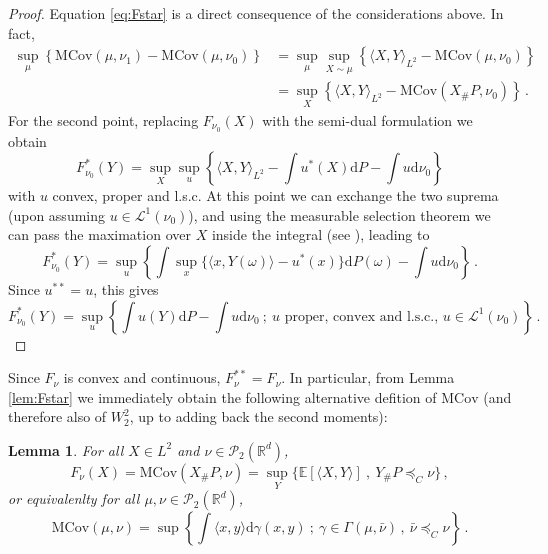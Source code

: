 \documentclass[12pt]{amsart}
\numberwithin{equation}{section}
\let\mc=\mathcal
\let\mr=\mathrm
\def\ed{\mathrm{d}}
\theoremstyle{plain}
\newtheorem{lemma}[theorem]{Lemma}
\theoremstyle{definition}
\newcommand\gab{\textcolor{blue}}
\begin{document}
\begin{proof} Equation \eqref{eq:Fstar} is a direct consequence of the considerations above. In fact,
\[
\begin{aligned}
\sup_\mu \left\{\mr{MCov}(\mu,\nu_1) -\mr{MCov}(\mu,\nu_0) \right\} &= \sup_\mu  \sup_{X \sim \mu} \left\{\langle X,Y\rangle_{L^2}  -\mr{MCov}(\mu,\nu_0) \right\} \\
&= \sup_X \left\{ \langle X,Y\rangle_{L^2}  -\mr{MCov}(X_\# P,\nu_0) \right\}\,.
\end{aligned}
\]
For the second point, replacing $F_{\nu_0}(X)$ with the semi-dual formulation we obtain
\begin{equation}\label{eq:supsupF}
F^*_{\nu_0}(Y) = \sup_X \sup_u \left\{ \langle X,Y\rangle_{L^2} - \int u^*(X) \ed P - \int u \ed \nu_0 \right\}
\end{equation}
with $u$ convex, proper and l.s.c. At this point we can exchange the two suprema (upon assuming $ u \in \mc{L}^1(\nu_0)$), and using the measurable selection theorem \cite[Theorem 6.9.13]{bogachev2007measure}
we can pass the maximation over $X$ inside the integral (see \cite[Lemma B.2]{aubin2026debiasing}), leading to
\[
F^*_{\nu_0}(Y) =  \sup_u \left\{ \int \sup_x\{ \langle x,Y(\omega)\rangle - u^*(x)\}  \ed P(\omega)- \int u \ed \nu_0 \right\}\,.
\]
Since $u^{**} = u$, this gives
\[
F^*_{\nu_0}(Y) = \sup_u \left\{ \int u(Y) \ed P - \int u \ed \nu_0 ~;~ u \text{ proper, convex and l.s.c., } u \in \mc{L}^1(\nu_0)\right\}\,.
\]
\end{proof}



Since $F_\nu$ is convex and continuous, $F^{**}_\nu = F_\nu$. In particular, from Lemma \ref{lem:Fstar} we immediately obtain the following alternative defition of $\mr{MCov}$ (and therefore also of $W_2^2$, up to adding back the second moments):

\begin{lemma}\label{lem:mcov} For all $X\in L^2$ and $\nu \in \mc{P}_2(\mathbb{R}^d)$,
\[
F_\nu(X)=\mr{MCov}(X_\#P,\nu) = \sup_Y\{\mathbb{E}[\langle X,Y\rangle]~,~Y_\#P \preceq_C \nu\}\,,
\]
or equivalenlty for all $\mu,\nu \in \mc{P}_2(\mathbb{R}^d)$,
\[
\mr{MCov}(\mu,\nu) = \sup\left\{ \int\langle x,y\rangle\ed \gamma(x,y) ~ ; ~\gamma \in \Gamma(\mu,\bar{\nu}) \,,~ \bar{\nu} \preceq_C \nu \right\}\,.
\]
\end{lemma}
\end{document}
